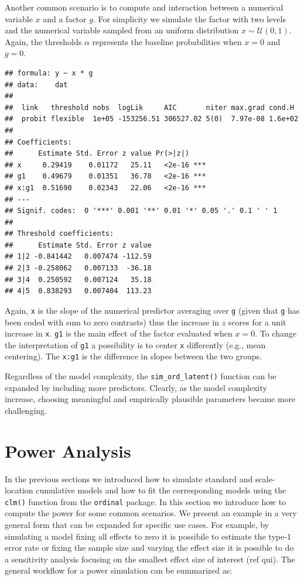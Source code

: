 \documentclass[
  man,floatsintext]{apa6}
\begin{document}
Another common scenario is to compute and interaction between a numerical variable \(x\) and a factor \(g\). For simplicity we simulate the factor with two levels and the numerical variable sampled from an uniform distribution \(x \sim \mathcal{U}(0, 1)\). Again, the thresholds \(\alpha\) represents the baseline probabilities when \(x = 0\) and \(g = 0\).

\scriptsize

\begin{verbatim}
## formula: y ~ x * g
## data:    dat
## 
##  link   threshold nobs  logLik     AIC       niter max.grad cond.H 
##  probit flexible  1e+05 -153256.51 306527.02 5(0)  7.97e-08 1.6e+02
## 
## Coefficients:
##      Estimate Std. Error z value Pr(>|z|)    
## x     0.29419    0.01172   25.11   <2e-16 ***
## g1    0.49679    0.01351   36.78   <2e-16 ***
## x:g1  0.51690    0.02343   22.06   <2e-16 ***
## ---
## Signif. codes:  0 '***' 0.001 '**' 0.01 '*' 0.05 '.' 0.1 ' ' 1
## 
## Threshold coefficients:
##      Estimate Std. Error z value
## 1|2 -0.841442   0.007474 -112.59
## 2|3 -0.258062   0.007133  -36.18
## 3|4  0.250592   0.007124   35.18
## 4|5  0.838293   0.007404  113.23
\end{verbatim}

\normalsize

Again, \texttt{x} is the slope of the numerical predictor averaging over \texttt{g} (given that \texttt{g} has been coded with sum to zero contrasts) thus the increase in \(z\) scores for a unit increase in \texttt{x}. \texttt{g1} is the main effect of the factor evaluated when \(x = 0\). To change the interpretation of \texttt{g1} a possibility is to center \texttt{x} differently (e.g., mean centering). The \texttt{x:g1} is the difference in slopes between the two groups.

Regardless of the model complexity, the \texttt{sim\_ord\_latent()} function can be expanded by including more predictors. Clearly, as the model complexity increase, choosing meaningful and empirically plausible parameters became more challenging.

\section{Power Analysis}\label{power-analysis}

In the previous sections we introduced how to simulate standard and scale-location cumulative models and how to fit the corresponding models using the \texttt{clm()} function from the \texttt{ordinal} package. In this section we introduce how to compute the power for some common scenarios. We present an example in a very general form that can be expanded for specific use cases. For example, by simulating a model fixing all effects to zero it is possibile to estimate the type-1 error rate or fixing the sample size and varying the effect size it is possible to do a sensitivity analysis focusing on the smallest effect size of interest (ref qui). The general workflow for a power simulation can be summarized as:
\end{document}
